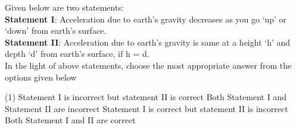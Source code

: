 \item Given below are two statements: \\
\textbf{Statement I}: Acceleration due to earth's gravity decreases as you go ‘up’ or ‘down’ from earth’s surface. \\
\textbf{Statement II}: Acceleration due to earth’s gravity is same at a height ‘h’ and depth ‘d’ from earth’s surface, if h = d. \\
In the light of above statements, choose the most appropriate answer from the options given below
\begin{tasks}(1)
    \task Statement I is incorrect but statement II is correct
    \task Both Statement I and Statement II are incorrect
    \task Statement I is correct but statement II is incorrect
    \task Both Statement I and II are correct
\end{tasks}